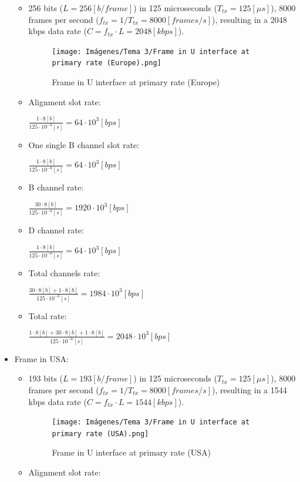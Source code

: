 \documentclass[
	12pt,
	twoside
]{book}
\begin{document}
\begin{itemize}
{		\begin{itemize}
			\item {
				256 bits ($L = 256 [b/frame]$) in 125 microseconds ($T_{tx} = 125 [\mu s]$), 8000 frames per second ($f_{tx} = 1/T_{tx} = 8000 [frames/s]$), resulting in a 2048 kbps data rate ($C = f_{tx} \cdot L = 2048 [kbps]$).

				\begin{figure}[H]
					\centering
					\texttt{[image: Imágenes/Tema 3/Frame in U interface at primary rate (Europe).png]}
					\caption{
						\label{fig:unit3_frame_U_primary_EU}
						Frame in U interface at primary rate (Europe)
					}
				\end{figure}
			}
			\item {
				Alignment slot rate:

				$
					\frac {1 \cdot 8 [b]} {125 \cdot 10^{-6} [s]} = 64 \cdot 10^3 [bps]
				$
			}
			\item {
				One single B channel slot rate:

				$
					\frac {1 \cdot 8 [b]} {125 \cdot 10^{-6} [s]} = 64 \cdot 10^3 [bps]
				$
			}
			\item {
				B channel rate:

				$
					\frac {30 \cdot 8 [b]} {125 \cdot 10^{-6} [s]} = 1920 \cdot 10^3 [bps]
				$
			}
			\item {
				D channel rate:

				$
					\frac {1 \cdot 8 [b]} {125 \cdot 10^{-6} [s]} = 64 \cdot 10^3 [bps]
				$
			}
			\item {
				Total channels rate:

				$
					\frac {30 \cdot 8 [b] + 1 \cdot 8 [b]} {125 \cdot 10^{-6} [s]} = 1984 \cdot 10^3 [bps]
				$
			}
			\item {
				Total rate:

				$
					\frac {1 \cdot 8 [b] + 30 \cdot 8 [b] + 1 \cdot 8 [b]} {125 \cdot 10^{-6} [s]} = 2048 \cdot 10^3 [bps]
				$
			}
		\end{itemize}
	}
	\item {
		Frame in USA:

		\begin{itemize}
			\item {
				193 bits ($L = 193 [b/frame]$) in 125 microseconds ($T_{tx} = 125 [\mu s]$), 8000 frames per second ($f_{tx} = 1/T_{tx} = 8000 [frames/s]$), resulting in a 1544 kbps data rate ($C = f_{tx} \cdot L = 1544 [kbps]$).

				\begin{figure}[H]
					\centering
					\texttt{[image: Imágenes/Tema 3/Frame in U interface at primary rate (USA).png]}
					\caption{
						\label{fig:unit3_frame_U_primary_USA}
						Frame in U interface at primary rate (USA)
					}
				\end{figure}
			}
			\item {
				Alignment slot rate:

}
\end{itemize}}
\end{itemize}
\end{document}
